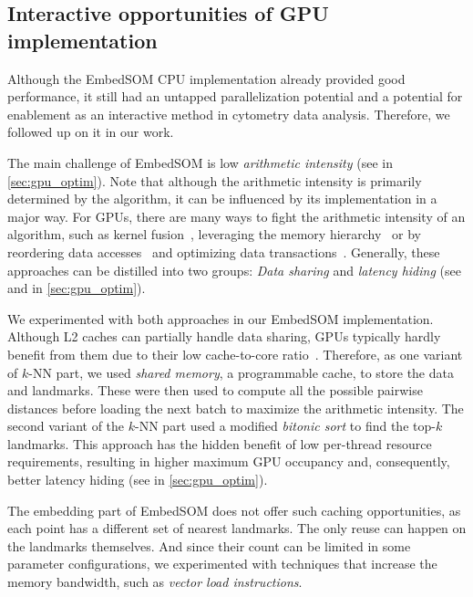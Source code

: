\subsection{Interactive opportunities of GPU implementation}

Although the EmbedSOM CPU implementation already provided good performance, it still had an untapped parallelization potential and a potential for enablement as an interactive method in cytometry data analysis. Therefore, we followed up on it in our work.

The main challenge of EmbedSOM is low \emph{arithmetic intensity} (see  in \cref{sec:gpu_optim}). Note that although the arithmetic intensity is primarily determined by the algorithm, it can be influenced by its implementation in a major way. For GPUs, there are many ways to fight the arithmetic intensity of an algorithm, such as kernel fusion~\cite{wahib2014scalable}, leveraging the memory hierarchy~\cite{lee2012cuda} or by reordering data accesses~\cite{ghysels2012improving} and optimizing data transactions~\cite{lu2020optimizing}. Generally, these approaches can be distilled into two groups: \emph{Data sharing} and \emph{latency hiding} (see  and  in \cref{sec:gpu_optim}).

We experimented with both approaches in our EmbedSOM implementation. Although L2 caches can partially handle data sharing, GPUs typically hardly benefit from them due to their low cache-to-core ratio~\cite{site:cuda}. Therefore, as one variant of $k$-NN part, we used \emph{shared memory}, a programmable cache, to store the data and landmarks. These were then used to compute all the possible pairwise distances before loading the next batch to maximize the arithmetic intensity. The second variant of the $k$-NN part used a modified \emph{bitonic sort} to find the top-$k$ landmarks. This approach has the hidden benefit of low per-thread resource requirements, resulting in higher maximum GPU occupancy and, consequently, better latency hiding  (see  in \cref{sec:gpu_optim}).

The embedding part of EmbedSOM does not offer such caching opportunities, as each point has a different set of nearest landmarks. The only reuse can happen on the landmarks themselves. And since their count can be limited in some parameter configurations, we experimented with techniques that increase the memory bandwidth, such as \emph{vector load instructions}.

